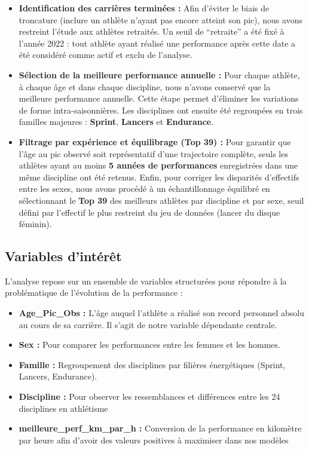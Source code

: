 \documentclass[
  french,
  11pt,
  a4paper,
]{article}
\providecommand{\tightlist}{%
  \setlength{\itemsep}{0pt}\setlength{\parskip}{0pt}}
\begin{document}
\begin{itemize}
\tightlist
\item
  \textbf{Identification des carrières terminées :} Afin d'éviter le
  biais de troncature (inclure un athlète n'ayant pas encore atteint son
  pic), nous avons restreint l'étude aux athlètes retraités. Un seuil de
  ``retraite'' a été fixé à l'année 2022 : tout athlète ayant réalisé
  une performance après cette date a été considéré comme actif et exclu
  de l'analyse.
\item
  \textbf{Sélection de la meilleure performance annuelle :} Pour chaque
  athlète, à chaque âge et dans chaque discipline, nous n'avons conservé
  que la meilleure performance annuelle. Cette étape permet d'éliminer
  les variations de forme intra-saisonnières. Les disciplines ont
  ensuite été regroupées en trois familles majeures : \textbf{Sprint},
  \textbf{Lancers} et \textbf{Endurance}.
\item
  \textbf{Filtrage par expérience et équilibrage (Top 39) :} Pour
  garantir que l'âge au pic observé soit représentatif d'une trajectoire
  complète, seuls les athlètes ayant au moins \textbf{5 années de
  performances} enregistrées dans une même discipline ont été retenus.
  Enfin, pour corriger les disparités d'effectifs entre les sexes, nous
  avons procédé à un échantillonnage équilibré en sélectionnant le
  \textbf{Top 39} des meilleurs athlètes par discipline et par sexe,
  seuil défini par l'effectif le plus restreint du jeu de données
  (lancer du disque féminin).
\end{itemize}

\subsection{Variables d'intérêt}\label{variables-dintuxe9ruxeat}

L'analyse repose sur un ensemble de variables structurées pour répondre
à la problématique de l'évolution de la performance :

\begin{itemize}
\tightlist
\item
  \textbf{Age\_Pic\_Obs :} L'âge auquel l'athlète a réalisé son record
  personnel absolu au cours de sa carrière. Il s'agit de notre variable
  dépendante centrale.
\item
  \textbf{Sex :} Pour comparer les performances entre les femmes et les
  hommes.
\item
  \textbf{Famille :} Regroupement des disciplines par filières
  énergétiques (Sprint, Lancers, Endurance).
\item
  \textbf{Discipline :} Pour observer les ressemblances et différences
  entre les 24 disciplines en athlétisme
\item
  \textbf{meilleure\_perf\_km\_par\_h :} Conversion de la performance en
  kilomètre par heure afin d'avoir des valeurs positives à maximiser
  dans nos modèles
\end{itemize}
\end{document}
